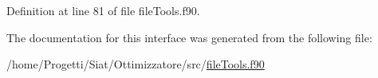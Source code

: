 Definition at line 81 of file file\-Tools.\-f90.



The documentation for this interface was generated from the following file\-:\begin{DoxyCompactItemize}
\item 
/home/\-Progetti/\-Siat/\-Ottimizzatore/src/\hyperlink{file_tools_8f90}{file\-Tools.\-f90}\end{DoxyCompactItemize}
